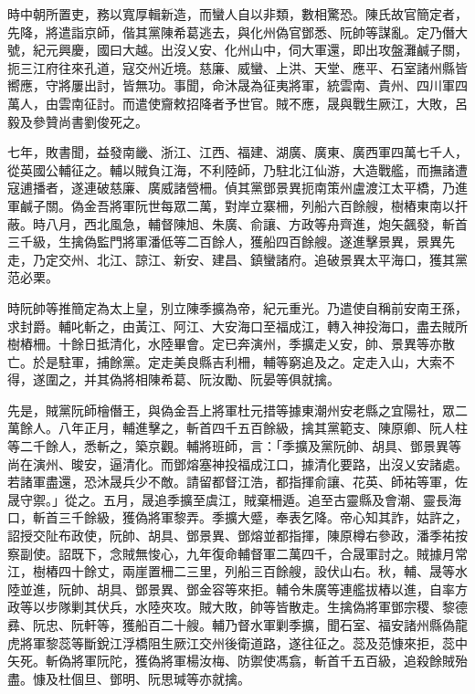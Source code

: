 \begin{pinyinscope}
時中朝所置吏，務以寬厚輯新造，而蠻人自以非類，數相驚恐。陳氏故官簡定者，先降，將遣詣京師，偕其黨陳希葛逃去，與化州偽官鄧悉、阮帥等謀亂。定乃僭大號，紀元興慶，國曰大越。出沒乂安、化州山中，伺大軍還，即出攻盤灘鹹子關，扼三江府往來孔道，寇交州近境。慈廉、威蠻、上洪、天堂、應平、石室諸州縣皆嚮應，守將屢出討，皆無功。事聞，命沐晟為征夷將軍，統雲南、貴州、四川軍四萬人，由雲南征討。而遣使齎敕招降者予世官。賊不應，晟與戰生厥江，大敗，呂毅及參贊尚書劉俊死之。

七年，敗書聞，益發南畿、浙江、江西、福建、湖廣、廣東、廣西軍四萬七千人，從英國公輔征之。輔以賊負江海，不利陸師，乃駐北江仙游，大造戰艦，而撫諸遭寇逋播者，遂連破慈廉、廣威諸營柵。偵其黨鄧景異扼南策州盧渡江太平橋，乃進軍鹹子關。偽金吾將軍阮世每眾二萬，對岸立寨柵，列船六百餘艘，樹樁東南以扞蔽。時八月，西北風急，輔督陳旭、朱廣、俞讓、方政等舟齊進，炮矢飆發，斬首三千級，生擒偽監門將軍潘低等二百餘人，獲船四百餘艘。遂進擊景異，景異先走，乃定交州、北江、諒江、新安、建昌、鎮蠻諸府。追破景異太平海口，獲其黨范必栗。

時阮帥等推簡定為太上皇，別立陳季擴為帝，紀元重光。乃遣使自稱前安南王孫，求封爵。輔叱斬之，由黃江、阿江、大安海口至福成江，轉入神投海口，盡去賊所樹樁柵。十餘日抵清化，水陸畢會。定已奔演州，季擴走乂安，帥、景異等亦散亡。於是駐軍，捕餘黨。定走美良縣吉利柵，輔等窮追及之。定走入山，大索不得，遂圍之，并其偽將相陳希葛、阮汝勵、阮晏等俱就擒。

先是，賊黨阮師檜僭王，與偽金吾上將軍杜元措等據東潮州安老縣之宜陽社，眾二萬餘人。八年正月，輔進擊之，斬首四千五百餘級，擒其黨範支、陳原卿、阮人柱等二千餘人，悉斬之，築京觀。輔將班師，言：「季擴及黨阮帥、胡具、鄧景異等尚在演州、晙安，逼清化。而鄧熔塞神投福成江口，據清化要路，出沒乂安諸處。若諸軍盡還，恐沐晟兵少不敵。請留都督江浩，都指揮俞讓、花英、師祐等軍，佐晟守禦。」從之。五月，晟追季擴至虞江，賊棄柵遁。追至古靈縣及會潮、靈長海口，斬首三千餘級，獲偽將軍黎弄。季擴大蹙，奉表乞降。帝心知其詐，姑許之，詔授交阯布政使，阮帥、胡具、鄧景異、鄧熔並都指揮，陳原樽右參政，潘季祐按察副使。詔既下，念賊無悛心，九年復命輔督軍二萬四千，合晟軍討之。賊據月常江，樹樁四十餘丈，兩崖置柵二三里，列船三百餘艘，設伏山右。秋，輔、晟等水陸並進，阮帥、胡具、鄧景異、鄧金容等來拒。輔令朱廣等連艦拔樁以進，自率方政等以步隊剿其伏兵，水陸夾攻。賊大敗，帥等皆散走。生擒偽將軍鄧宗稷、黎德彞、阮忠、阮軒等，獲船百二十艘。輔乃督水軍剿季擴，聞石室、福安諸州縣偽龍虎將軍黎蕊等斷銳江浮橋阻生厥江交州後衛道路，遂往征之。蕊及范慷來拒，蕊中矢死。斬偽將軍阮陀，獲偽將軍楊汝梅、防禦使馮翕，斬首千五百級，追殺餘賊殆盡。慷及杜個旦、鄧明、阮思瑊等亦就擒。


\end{pinyinscope}
